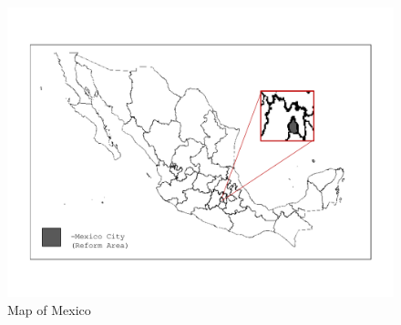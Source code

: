 \documentclass[a4paper, 11pt]{article}
\begin{document}
\begin{spacing}{2}
\begin{figure}[H]\caption{Map of Mexico}\label{Map}\centering
\includegraphics[scale=0.6]{figures/MapMexico.pdf}
\end{figure}
\restoregeometry
 

\end{spacing}
\end{document}
